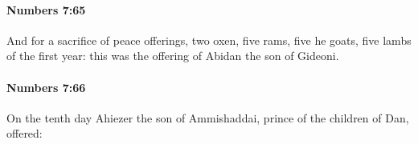 		\paragraph{Numbers 7:65} %
			\label{NUMBERS-7-65}

			And for a sacrifice of peace offerings, two oxen, five rams, five he goats, five lambs of the first year: this was the offering of Abidan the son of Gideoni.


		\paragraph{Numbers 7:66} %
			\label{NUMBERS-7-66}

			On the tenth day Ahiezer the son of Ammishaddai, prince of the children of Dan, offered:


